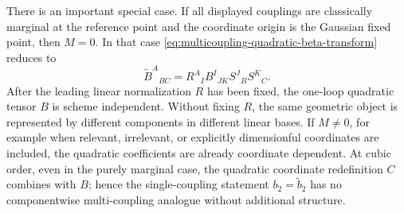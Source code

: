There is an important special case.  If all displayed couplings are
classically marginal at the reference point and the coordinate origin is the
Gaussian fixed point, then \(M=0\).  In that case
\eqref{eq:multicoupling-quadratic-beta-transform} reduces to
\[
  \widetilde B^A{}_{BC}
  =
  R^A{}_I B^I{}_{JK}S^J{}_B S^K{}_C .
\]
After the leading linear normalization \(R\) has been fixed, the one-loop
quadratic tensor \(B\) is scheme independent.  Without fixing \(R\), the same
geometric object is represented by different components in different linear
bases.  If \(M\neq0\), for example when relevant, irrelevant, or explicitly
dimensionful coordinates are included, the quadratic coefficients are already
coordinate dependent.  At cubic order, even in the purely marginal case, the
quadratic coordinate redefinition \(C\) combines with \(B\); hence the
single-coupling statement \(b_2=\widetilde b_2\) has no componentwise
multi-coupling analogue without additional structure.

